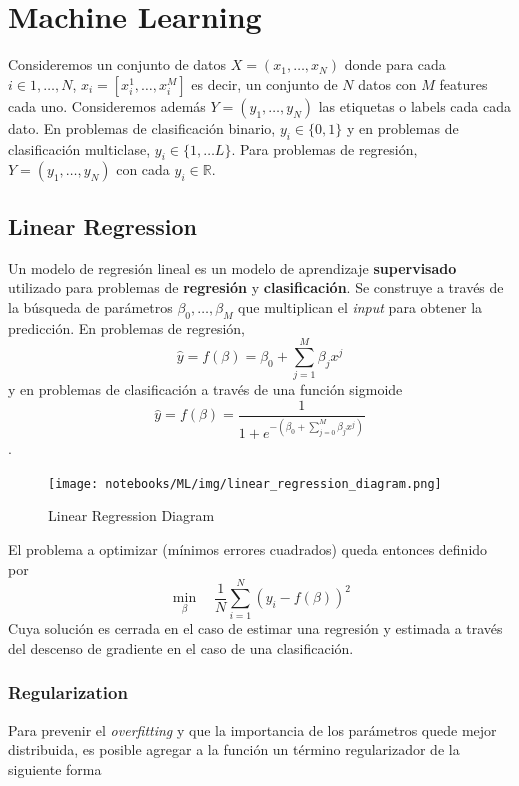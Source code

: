 \section{Machine Learning}

Consideremos un conjunto de datos $X = (x_1, \dots , x_N)$ donde para cada $i \in {1, \dots, N}$, $x_i = [x_{i}^1 , \dots, x_{i}^M]$ es decir, un conjunto de $N$ datos con $M$ features cada uno. Consideremos además $Y = (y_1, \dots , y_N)$ las etiquetas o labels cada cada dato. En problemas de clasificación binario, $y_i \in \{ 0, 1\}$ y en problemas de clasificación multiclase, $y_i \in \{1, \dots L\}$. Para problemas de regresión, $Y = (y_1, \dots , y_N)$ con cada $y_i \in \mathbb{R}$.

\subsection{Linear Regression}

Un modelo de regresión lineal es un modelo de aprendizaje \textbf{supervisado} utilizado para problemas de \textbf{regresión} y \textbf{clasificación}. Se construye a través de la búsqueda de parámetros $\beta_0, \dots, \beta_M$ que multiplican el \textit{input} para obtener la predicción. En problemas de regresión, 
$$\hat{y} = f(\beta) = \beta_0 + \sum_{j=1}^M \beta_j x^j$$
y en problemas de clasificación a través de una función sigmoide 
$$\hat{y} = f(\beta) = \frac{1}{1+e^{- (\beta_0 + \sum_{j=0}^M \beta_j x^j)}}$$.

\begin{figure}[H]
    \center
    \texttt{[image: notebooks/ML/img/linear\_regression\_diagram.png]}
    \caption{Linear Regression Diagram}
\end{figure}

El problema a optimizar (mínimos errores cuadrados) queda entonces definido por 
$$\min_{\beta} \quad \frac{1}{N}\sum_{i=1}^N(y_i - f(\beta))^2$$
Cuya solución es cerrada en el caso de estimar una regresión y estimada a través del descenso de gradiente en el caso de una clasificación. 

\subsubsection{Regularization}

Para prevenir el \textit{overfitting} y que la importancia de los parámetros quede mejor distribuida, es posible agregar a la función un término regularizador de la siguiente forma

